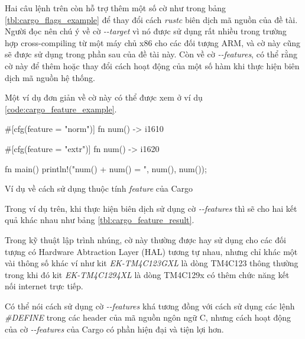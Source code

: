 Hai câu lệnh trên còn hỗ trợ thêm một số cờ như trong bảng \ref{tbl:cargo_flags_example} để thay đổi cách \emph{rustc} biên dịch mã nguồn của đề tài.
Người đọc nên chú ý về cờ \emph{-{}-target} vì nó được sử dụng rất nhiều trong trường hợp cross-compiling từ một máy chủ x86 cho các đối tượng ARM, và cờ này cũng sẽ được sử dụng trong phần sau của đề tài này.
Còn về cờ \emph{-{}-features}, có thể rằng cờ này để thêm hoặc thay đổi cách hoạt động của một số hàm khi thực hiện biên dịch mã nguồn hệ thống.

Một ví dụ đơn giản về cờ này có thể được xem ở ví dụ \ref{code:cargo_feature_example}.

\begin{listing}
\begin{rustcode}
#[cfg(feature = "norm")]
fn num() -> i16{10}

#[cfg(feature = "extr")]
fn num() -> i16{20}

fn main() {
    println!("num() + num() = {} ", num(), num());
}
\end{rustcode}
\caption{Ví dụ về cách sử dụng thuộc tính \emph{feature} của Cargo}
\label{code:cargo_feature_example}
\end{listing}

Trong ví dụ trên, khi thực hiện biên dịch sử dụng cờ \emph{-{}-features} thì sẽ cho hai kết quả khác nhau như bảng \ref{tbl:cargo_feature_result}.


Trong kỹ thuật lập trình nhúng, cờ này thường được hay sử dụng cho các đối tượng có Hardware Abtraction Layer (HAL) tương tự nhau, nhưng chỉ khác một vài thông số khác ví như kit \emph{EK-TM4C123GXL} là dòng TM4C123 thông thường trong khi đó kit \emph{EK-TM4C1294XL} là dòng TM4C129x có thêm chức năng kết nối internet trực tiếp.

Có thể nói cách sử dụng cờ \emph{-{}-features} khá tương đồng với cách sử dụng các lệnh \emph{\#DEFINE} trong các header của mã nguồn ngôn ngữ C, nhưng cách hoạt động của cờ \emph{-{}-features} của Cargo có phần hiện đại và tiện lợi hơn.

